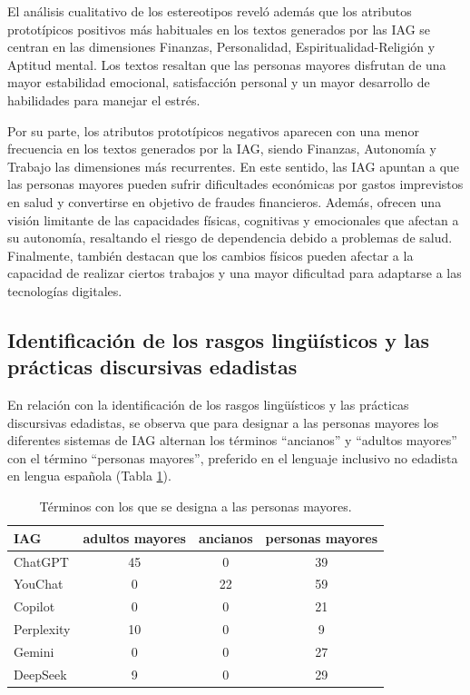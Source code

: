 \documentclass[spanish]{textolivre}
\begin{document}
El análisis cualitativo de los estereotipos reveló además que los atributos prototípicos positivos más habituales en los textos generados por las IAG se centran en las dimensiones Finanzas, Personalidad, Espiritualidad-Religión y Aptitud mental. Los textos resaltan que las personas mayores disfrutan de una mayor estabilidad emocional, satisfacción personal y un mayor desarrollo de habilidades para manejar el estrés.

Por su parte, los atributos prototípicos negativos aparecen con una menor frecuencia en los textos generados por la IAG, siendo Finanzas, Autonomía y Trabajo las dimensiones más recurrentes. En este sentido, las IAG apuntan a que las personas mayores pueden sufrir dificultades económicas por gastos imprevistos en salud y convertirse en objetivo de fraudes financieros. Además, ofrecen una visión limitante de las capacidades físicas, cognitivas y emocionales que afectan a su autonomía, resaltando el riesgo de dependencia debido a problemas de salud. Finalmente, también destacan que los cambios físicos pueden afectar a la capacidad de realizar ciertos trabajos y una mayor dificultad para adaptarse a las tecnologías digitales.

\subsection{Identificación de los rasgos lingüísticos y las prácticas discursivas edadistas}
En relación con la identificación de los rasgos lingüísticos y las prácticas discursivas edadistas, se observa que para designar a las personas mayores los diferentes sistemas de IAG alternan los términos ``ancianos'' y ``adultos mayores'' con el término ``personas mayores'', preferido en el lenguaje inclusivo no edadista en lengua española (Tabla \ref{tab-6}).

\begin{table}[h!]
\centering
\begin{threeparttable}
\caption{Términos con los que se designa a las personas mayores.}\label{tab-6}
\begin{tabular}{lccc}
\toprule
IAG & adultos mayores & ancianos & personas mayores \\
\midrule
ChatGPT & 45 & 0 & 39 \\
YouChat & 0 & 22 & 59 \\
Copilot & 0 & 0 & 21 \\
Perplexity & 10 & 0 & 9 \\
Gemini & 0 & 0 & 27 \\
DeepSeek & 9 & 0 & 29 \\
\bottomrule
\end{tabular}
\end{threeparttable}
\end{table}
\end{document}

